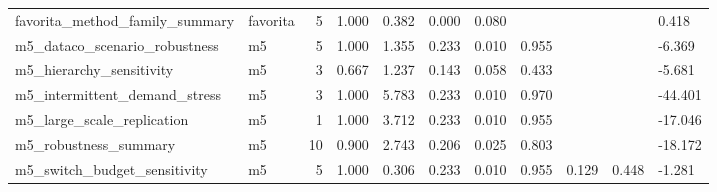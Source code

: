 \begin{table}
{\begin{tabular}{llrllllllll}
              favorita\_method\_family\_summary &     favorita &                       5 &                                    1.000 &                        0.382 &                                      0.000 &                                       0.080 &                        &                  &                       &                      0.418 \\
               m5\_dataco\_scenario\_robustness &           m5 &                       5 &                                    1.000 &                        1.355 &                                      0.233 &                                       0.010 &                  0.955 &                  &                       &                     -6.369 \\
                    m5\_hierarchy\_sensitivity &           m5 &                       3 &                                    0.667 &                        1.237 &                                      0.143 &                                       0.058 &                  0.433 &                  &                       &                     -5.681 \\
               m5\_intermittent\_demand\_stress &           m5 &                       3 &                                    1.000 &                        5.783 &                                      0.233 &                                       0.010 &                  0.970 &                  &                       &                    -44.401 \\
                  m5\_large\_scale\_replication &           m5 &                       1 &                                    1.000 &                        3.712 &                                      0.233 &                                       0.010 &                  0.955 &                  &                       &                    -17.046 \\
                       m5\_robustness\_summary &           m5 &                      10 &                                    0.900 &                        2.743 &                                      0.206 &                                       0.025 &                  0.803 &                  &                       &                    -18.172 \\
                m5\_switch\_budget\_sensitivity &           m5 &                       5 &                                    1.000 &                        0.306 &                                      0.233 &                                       0.010 &                  0.955 &            0.129 &                 0.448 &                     -1.281 \\

\end{tabular}}
\end{table}
